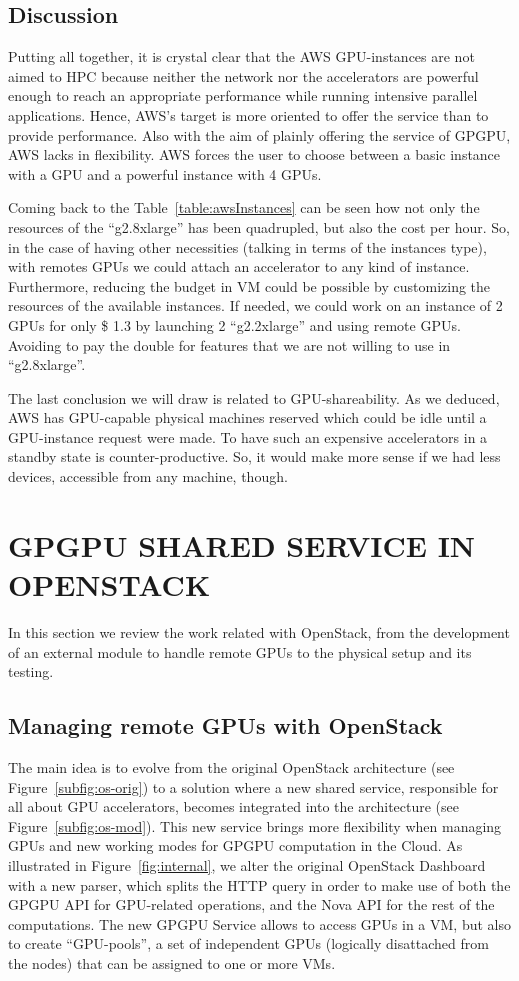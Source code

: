 \documentclass[a4paper,twoside]{article}
\begin{document}
\subsection{Discussion}
Putting all together,  it is crystal clear that the AWS GPU-instances are not aimed to HPC because neither the network nor the accelerators are powerful enough to reach an appropriate performance
while running intensive parallel applications. 
Hence, AWS's target is more oriented to offer the service than to provide performance.
Also with the aim of plainly offering the service of GPGPU, AWS lacks in flexibility. 
AWS forces the user to choose between a basic instance with a GPU and a powerful instance with 4 GPUs.

Coming back to the Table~\ref{table:awsInstances} can be seen how not only the resources of the ``g2.8xlarge'' has been quadrupled, but also the cost per hour.
So, in the case of having other necessities (talking in terms of the instances type), with remotes GPUs we could attach an accelerator to any kind of instance.
Furthermore, reducing the budget in VM could be possible by customizing the resources of the available instances.
If needed, we could work on an instance of 2 GPUs for only \$ 1.3 by launching 2 ``g2.2xlarge'' and using remote GPUs. 
Avoiding to pay the double for features that we are not willing to use in ``g2.8xlarge''.

The last conclusion we will draw is related to GPU-shareability. 
As we deduced, AWS has GPU-capable physical machines reserved which could be idle until a GPU-instance request were made.
To have such an expensive accelerators in a standby state is counter-productive. So, it would make more sense if we had less devices, accessible from any machine, though.

\section{\uppercase{GPGPU Shared Service in OpenStack}}
\label{sec:gpgpuOS}
In this section we review the work related with OpenStack, from the development of an external module to handle remote GPUs to the physical setup and its testing.

\subsection{Managing remote GPUs with OpenStack}
The main idea is to evolve from the original OpenStack architecture (see Figure~\ref{subfig:os-orig})
 to a solution where a new shared service, responsible for all about GPU accelerators, becomes integrated into the architecture (see Figure~\ref{subfig:os-mod}).
This new service brings more flexibility when managing GPUs and new working modes for GPGPU computation in the Cloud.
As illustrated in Figure~\ref{fig:internal}, we alter the original OpenStack Dashboard with a new parser, 
which splits the HTTP query in order to make use of both the GPGPU API for GPU-related operations, and the Nova API for the rest of the computations. 
The new GPGPU Service allows to access GPUs in a VM, but also to create ``GPU-pools'', a set of independent GPUs (logically disattached from the nodes) that can be assigned to one or more VMs.
\end{document}
